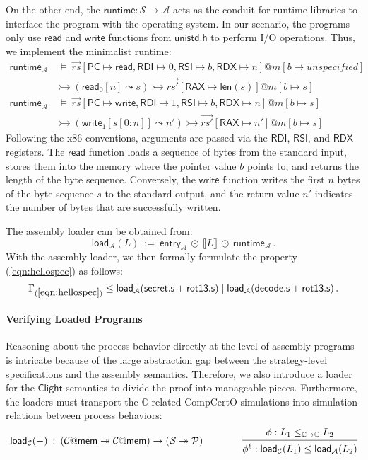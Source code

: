 \documentclass[acmsmall,nonacm]{acmart}
\newcommand{\kw}[1]{\ensuremath{ \mathsf{#1} }}
\begin{document}
On the other end,
the $\kw{runtime} : \mathcal{S} \rightarrow \mathcal{A}$
acts as the conduit for runtime libraries
to interface the program with the operating system.
In our scenario,
the programs only use $\kw{read}$ and $\kw{write}$
functions from $\kw{unistd.h}$
to perform I/O operations.
Thus, we implement the minimalist runtime:
{\footnotesize
\begin{align*}
  \kw{runtime}_\mathcal{A} & \:\vDash\:
  \vec{rs}[\kw{PC} \mapsto \kw{read},
    \kw{RDI} \mapsto 0,
    \kw{RSI} \mapsto b,
    \kw{RDX} \mapsto n]@m[b \mapsto unspecified] \\
  & \rightarrowtail (\kw{read}_0[n] \leadsto s)
    \rightarrowtail \vec{rs'}[\kw{RAX} \mapsto \kw{len}(s)]@m[b \mapsto s] \\
  \kw{runtime}_\mathcal{A} & \:\vDash\:
    \vec{rs}[\kw{PC} \mapsto \kw{write},
    \kw{RDI} \mapsto 1,
    \kw{RSI} \mapsto b,
    \kw{RDX} \mapsto n]@m[b \mapsto s] \\ 
 &  \rightarrowtail
  (\kw{write}_1[s[0:n]] \leadsto n')
  \rightarrowtail \vec{rs'}[\kw{RAX} \mapsto n']@m[b \mapsto s]
\end{align*}
}
Following the x86 conventions,
arguments are passed via
the \kw{RDI}, \kw{RSI}, and \kw{RDX} registers.
The \kw{read} function
loads a sequence of bytes
from the standard input,
stores them into the memory
where the pointer value $b$ points to,
and returns the length of the byte sequence.
Conversely, the \kw{write} function
writes the first $n$ bytes
of the byte sequence $s$
to the standard output,
and the return value $n'$ indicates
the number of bytes that are successfully written.

The assembly loader can be obtained from:
\[
  \kw{load}_\mathcal{A}(L)
  \::=\: \kw{entry}_\mathcal{A} \: \odot \: \llbracket L \rrbracket
  \: \odot \: \kw{runtime}_\mathcal{A}
  \,.
\]
With the assembly loader,
we then formally formulate the property (\ref{eqn:hellospec})
as follows:
\[
\Gamma_\kw{(\ref{eqn:hellospec})} \le \kw{load}_\mathcal{A}(\kw{secret.s} + \kw{rot13.s})
\mid \kw{load}_\mathcal{A}(\kw{decode.s} + \kw{rot13.s})
\,.
\]

\paragraph{Verifying Loaded Programs}

Reasoning about the process behavior
directly at the level of assembly programs
is intricate because of
the large abstraction gap between
the strategy-level specifications
and the assembly semantics.
Therefore,
we also introduce a loader
for the $\kw{Clight}$ semantics
to divide the proof
into manageable pieces.
Furthermore, the loaders
must transport
the $\mathbb{C}$-related CompCertO simulations
into
simulation relations
between process behaviors:
\[
  \kw{load}_\mathcal{C}(-)
  \: : \:
  (\mathcal{C}@\kw{mem} \twoheadrightarrow \mathcal{C}@\kw{mem}) \rightarrow (\mathcal{S} \twoheadrightarrow \mathcal{P})
  \qquad \qquad
  \begin{prooftree}
    \hypo{\phi: L_1 \le_{\mathbb{C} \rightarrow \mathbb{C}} L_2}
    \infer1{\phi^\ell: \kw{load}_\mathcal{C}(L_1) \le
      \kw{load}_\mathcal{A}(L_2)}
  \end{prooftree}
\]%
\end{document}
